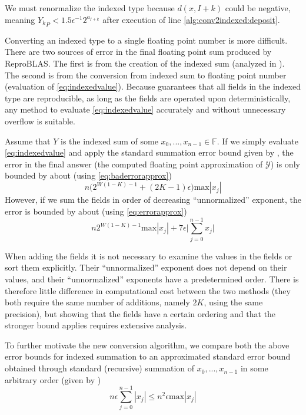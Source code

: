 \documentclass[12pt]{article}
\providecommand{\F}{\ensuremath{\mathbb{F}}}
\providecommand{\max}{\ensuremath{\text{max}}}
\theoremstyle{definition}
\numberwithin{equation}{section}
\numberwithin{figure}{section}
\begin{document}
    We must renormalize the indexed type because $d(x, I + k)$ could be negative, meaning ${Y_k}_P < 1.5  \epsilon^{-1} 2^{a_{I + k}}$ after execution of line \ref{alg:conv2indexed:deposit}.

    Converting an indexed type to a single floating point number is more difficult. There are two sources of error in the final floating point sum produced by ReproBLAS. The first is from the creation of the indexed sum (analyzed in \cite{repsum}). The second is from the conversion from indexed sum to floating point number (evaluation of  \eqref{eq:indexedvalue}).
    Because \cite{repsum} guarantees that all fields in the indexed type are reproducible, as long as the fields are operated upon deterministically, any method to evaluate  \eqref{eq:indexedvalue} accurately and without unnecessary overflow is suitable.

    Assume that $Y$ is the indexed sum of some $x_0, ..., x_{n - 1} \in \F$. If we simply evaluate \eqref{eq:indexedvalue} and apply the standard summation error bound given by \cite{higham}, the error in the final answer (the computed floating point approximation of $\mathcal{Y}$) is only bounded by about (using  \eqref{eq:baderrorapprox})
    \begin{equation}
      n \bigl(2^{W  (1 - K) - 1} + (2  K - 1)  \epsilon\bigr)\max|x_j|
      \label{eq:baderrorapproxdup}
    \end{equation}
    However, if we sum the fields in order of decreasing ``unnormalized'' exponent, the error is bounded by about (using  \eqref{eq:errorapprox})
    \begin{equation}
      n 2^{W  (1 - K) - 1}\max|x_j|  + 7 \epsilon \bigl|\sum\limits_{j = 0}^{n - 1} x_j\bigr|
      \label{eq:errorapproxdup}
    \end{equation}

    When adding the fields it is not necessary to examine the values in the fields or sort them explicitly. Their ``unnormalized'' exponent does not depend on their values, and their ``unnormalized'' exponents have a predetermined order. There is therefore little difference in computational cost between the two methods (they both require the same number of additions, namely $2  K$, using the same precision), but showing that the fields have a certain ordering and that the stronger bound applies requires extensive analysis.

    To further motivate the new conversion algorithm, we compare both the above error bounds for indexed summation to an approximated standard error bound obtained through standard (recursive) summation of $x_0, ..., x_{n - 1}$ in some arbitrary order (given by \cite{higham})
    \begin{equation}
      n  \epsilon  \sum\limits_{j = 0}^{n - 1}|x_j| \leq n^2  \epsilon  \max|x_j|
      \label{eq:naiveerrorapproxdup}
    \end{equation}
\end{document}
